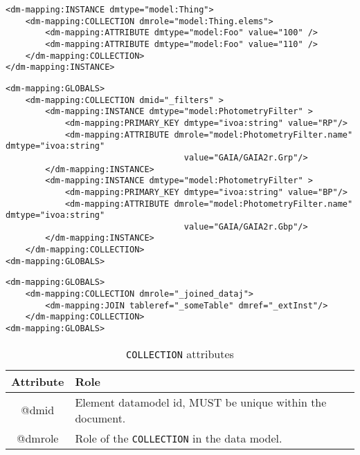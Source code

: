 \begin{lstlisting}[frame=single,caption={Example of COLLECTION child of INSTANCE},style=XML,basicstyle=\tiny]
<dm-mapping:INSTANCE dmtype="model:Thing">
    <dm-mapping:COLLECTION dmrole="model:Thing.elems">
        <dm-mapping:ATTRIBUTE dmtype="model:Foo" value="100" />
        <dm-mapping:ATTRIBUTE dmtype="model:Foo" value="110" />
    </dm-mapping:COLLECTION>
</dm-mapping:INSTANCE>
\end{lstlisting}   

\begin{lstlisting}[frame=single,caption={Example of COLLECTION child of GLOBALS},style=XML,basicstyle=\tiny]
<dm-mapping:GLOBALS>
    <dm-mapping:COLLECTION dmid="_filters" >
        <dm-mapping:INSTANCE dmtype="model:PhotometryFilter" >
            <dm-mapping:PRIMARY_KEY dmtype="ivoa:string" value="RP"/>
            <dm-mapping:ATTRIBUTE dmrole="model:PhotometryFilter.name" dmtype="ivoa:string"
                                    value="GAIA/GAIA2r.Grp"/>
        </dm-mapping:INSTANCE>
        <dm-mapping:INSTANCE dmtype="model:PhotometryFilter" >
            <dm-mapping:PRIMARY_KEY dmtype="ivoa:string" value="BP"/>
            <dm-mapping:ATTRIBUTE dmrole="model:PhotometryFilter.name" dmtype="ivoa:string"
                                    value="GAIA/GAIA2r.Gbp"/>
        </dm-mapping:INSTANCE>
    </dm-mapping:COLLECTION>
<dm-mapping:GLOBALS>
\end{lstlisting}   

\begin{lstlisting}[frame=single,caption={Example of COLLECTION populated with a JOIN},style=XML,basicstyle=\tiny]
<dm-mapping:GLOBALS>
    <dm-mapping:COLLECTION dmrole="_joined_dataj">
        <dm-mapping:JOIN tableref="_someTable" dmref="_extInst"/>
    </dm-mapping:COLLECTION>
<dm-mapping:GLOBALS>
\end{lstlisting}   


\begin{table}[!htbp]
  \small
  \centering
  \begin{tabulary}{\linewidth}{|c|J|}       
    \hline 
         \textbf{Attribute} & 
         \textbf {Role}\\
    \hline
    \hline  
         @dmid & 
         Element datamodel id, MUST be unique within the document.\\
    \hline 
         @dmrole & 
         Role of the \texttt{COLLECTION} in the data model. \\
    \hline 
  \end{tabulary}
  \caption{\texttt{COLLECTION} attributes} 
  \label{tbl:collection-att}
 \end{table}

